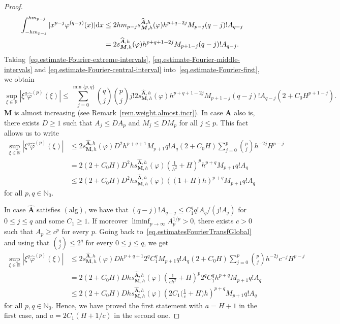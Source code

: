 \documentclass[12pt,a4paper]{article}
\newcommand{\N}{\mathbb{N}}
\newcommand{\R}{\mathbb{R}}
\newcommand{\M}{{\boldsymbol{M}}}
\newcommand{\A}{{\boldsymbol{A}}}
\newcommand{\hA}{\widehat{{\boldsymbol{A}}}}
\newcommand{\dx}{{\rm d}x }
\newcommand{\alg}{\operatorname{(alg)}}
\theoremstyle{plain}
\theoremstyle{definition}
\numberwithin{equation}{section}
\begin{document}
\begin{proof}
\begin{align}
\int_{-hm_{p-j}}^{hm_{p-j}} |x^{p-j}\varphi^{(q-j)}(x)|\dx &\le
2hm_{p-j}s_{\M,h}^{\hA,h}(\varphi)h^{p+q-2j}M_{p-j}(q-j)!A_{q-j}\nonumber\\
&=
2s_{\M,h}^{\hA,h}(\varphi)h^{p+q+1-2j}M_{p+1-j}(q-j)!A_{q-j}.
\label{eq.estimate-Fourier-central-interval}
\end{align}
Taking~\eqref{eq.estimate-Fourier-extreme-intervals}, \eqref{eq.estimate-Fourier-middle-intervals} and \eqref{eq.estimate-Fourier-central-interval} into~\eqref{eq.estimate-Fourier-first}, we obtain
\begin{equation}\label{eq.estimatesFourierTransfGlobal}
\sup_{\xi \in \R} |\xi^q\widehat{\varphi}^{(p)}(\xi)|\leq \sum_{j=0}^{\min\{p,q\}} \binom{q}{j}\binom{p}{j} j! 2s_{\M,h}^{\hA,h}(\varphi)h^{p+q+1-2j}M_{p+1-j}(q-j)!A_{q-j} (2+C_0H^{p+1-j}).
\end{equation}
$\M$ is almost increasing (see Remark~\ref{rem.weight.almost.incr}). In case $\A$ also is, there exists $D\ge 1$ such that $A_j\le DA_p$ and $M_j\le DM_p$ for all $j\le p$. This fact allows us to write
\begin{align*}
\sup_{\xi \in \R} |\xi^q\widehat{\varphi}^{(p)}(\xi)|&\leq
2s_{\M,h}^{\hA,h}(\varphi)D^2h^{p+q+1}M_{p+1}q!A_{q}(2+C_0H)
\sum_{j=0}^{p}\binom{p}{j}h^{-2j}H^{p-j}\\
&= 2(2+C_0H)D^2hs_{\M,h}^{\hA,h}(\varphi)\left(\frac{1}{h^2}+H\right)^p h^{p+q}M_{p+1}q!A_{q}\\
&\le 2(2+C_0H)D^2hs_{\M,h}^{\hA,h}(\varphi)\left((1+H)h\right)^{p+q} M_{p+1}q!A_{q}
\end{align*}
for all $p,q \in \N_0$.

In case $\hA$ satisfies $\alg$, we have that $(q-j)!A_{q-j}\le C_1^qq!A_q/(j!A_j)$ for $0\le j\le q$ and some $C_1\ge 1$. If moreover $\liminf_{p\to\infty}A_p^{1/p}>0$, there exists $c>0$ such that $A_p\ge c^p$ for every $p$. Going back to~\eqref{eq.estimatesFourierTransfGlobal} and using that  $\binom{q}{j}\le 2^q$ for every $0\le j\le q$, we get
\begin{align*}
\sup_{\xi \in \R} |\xi^q\widehat{\varphi}^{(p)}(\xi)|&\leq
2s_{\M,h}^{\hA,h}(\varphi)Dh^{p+q+1}2^qC_1^q M_{p+1}q!A_{q}(2+C_0H)
\sum_{j=0}^{p}\binom{p}{j}h^{-2j}c^{-j}H^{p-j}\\
&= 2(2+C_0H)Dhs_{\M,h}^{\hA,h}(\varphi)\left(\frac{1}{ch^2}+H\right)^p2^q C_1^qh^{p+q}M_{p+1}q!A_{q}\\
&\le 2(2+C_0H)Dhs_{\M,h}^{\hA,h}(\varphi) \left(2C_1\Big(\frac{1}{c}+H\Big)h\right)^{p+q}M_{p+1}q!A_{q}
\end{align*}
for all $p,q \in \N_0$. Hence, we have proved the first statement with $a=H+1$ in the first case, and $a=2C_1(H+1/c)$ in the second one.
\end{proof}
\end{document}

